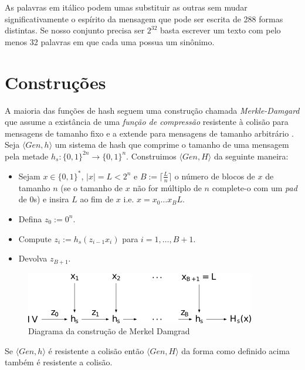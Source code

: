 
As palavras em itálico podem umas substituir as outras sem mudar significativamente o espírito da mensagem que pode ser escrita de 288 formas distintas.
Se nosso conjunto precisa ser $2^{32}$ basta escrever um texto com pelo menos 32 palavras em que cada uma possua um sinônimo.
 
\section{Construções}
\label{sec:construcoes}

A maioria das funções de hash seguem uma construção chamada {\em Merkle-Damgard} que assume a existância de uma {\em função de compressão} resistente à colisão para mensagens de tamanho fixo e a extende para mensagens de tamanho arbitrário \cite{Merkle89,Damgard89}.
Seja $\langle Gen, h \rangle$ um sistema de hash que comprime o tamanho de uma mensagem pela metade $h_s:\{0,1\}^{2n} \to \{0,1\}^n$.
Construimos $\langle Gen, H \rangle$ da seguinte maneira:
\begin{itemize}
\item Sejam $x \in \{0,1\}^*$, $|x| = L < 2^n$ e $B := \lceil \frac{L}{n} \rceil$ o número de blocos de $x$ de tamanho $n$ (se o tamanho de $x$ não for múltiplo de $n$ complete-o com um {\em pad} de $0$s) e insira $L$ ao fim de $x$ i.e. $x = x_0 \dots x_B L$.
\item Defina $z_0 := 0^n$.
\item Compute $z_i := h_s(z_{i-1}x_i)$ para $i = 1, \dots, B + 1$.
\item Devolva $z_{B+1}$.
\end{itemize}

\begin{figure}[htbp]
  \centering
    \includegraphics[width=.5\textwidth]{imagens/Merkle-Damgard.png}
  \caption{Diagrama da construção de Merkel Damgrad}
  \label{fig:merkle-damgard}
\end{figure}


\begin{theorem}
  Se $\langle Gen, h \rangle$ é resistente a colisão então $\langle Gen, H \rangle$ da forma como definido acima também é resistente a colisão.
\end{theorem}

